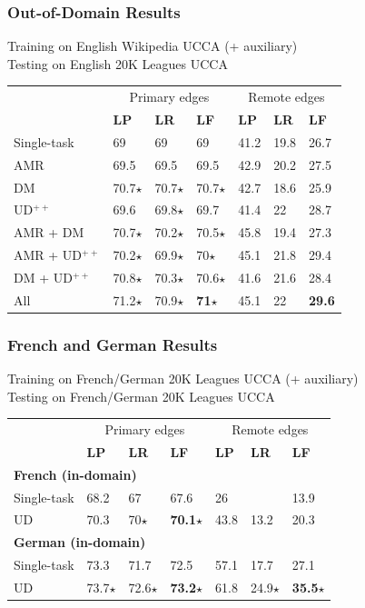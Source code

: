 \documentclass[t,xcolor={svgnames}]{beamer}
\begin{document}
\begin{frame}
\frametitle{Out-of-Domain Results}
Training on English Wikipedia UCCA (+ auxiliary) \\ Testing on English 20K Leagues UCCA
\begin{center}
	\begin{tabular}{l|lll|lll}
	& \multicolumn{3}{c|}{Primary edges} & \multicolumn{3}{c}{Remote edges} \\
	& \textbf{LP} & \textbf{LR} & \textbf{LF}
	& \textbf{LP} & \textbf{LR} & \textbf{LF} \\
	\hline
	Single-task
	& 69 & 69 & 69 & 41.2 & 19.8 & 26.7 \\
	\cline{1-1}
	AMR
	& 69.5 & 69.5 & 69.5 & 42.9 & 20.2 & 27.5 \\
	DM
	& 70.7$\star$ & 70.7$\star$ & 70.7$\star$ & 42.7 & 18.6 & 25.9 \\
	UD$^{++}$
	& 69.6 & 69.8$\star$ & 69.7 & 41.4 & 22 & 28.7 \\
	AMR + DM
	& 70.7$\star$ & 70.2$\star$ & 70.5$\star$ & 45.8 & 19.4 & 27.3 \\
	AMR + UD$^{++}$
	& 70.2$\star$ & 69.9$\star$ & 70$\star$ & 45.1 & 21.8 & 29.4 \\
	DM + UD$^{++}$
	& 70.8$\star$ & 70.3$\star$ & 70.6$\star$ & 41.6 & 21.6 & 28.4 \\
	All
	& 71.2$\star$ & 70.9$\star$ & \textbf{71}$\star$ & 45.1 & 22 & \textbf{29.6}
	\end{tabular}
\end{center}
\end{frame}

\begin{frame}
\frametitle{French and German Results}
Training on French/German 20K Leagues UCCA (+ auxiliary) \\ Testing on French/German 20K Leagues UCCA
\begin{center}
	\begin{tabular}{l|lll|lll}
	& \multicolumn{3}{c|}{Primary edges} & \multicolumn{3}{c}{Remote edges} \\
	& \textbf{LP} & \textbf{LR} & \textbf{LF}
	& \textbf{LP} & \textbf{LR} & \textbf{LF} \\
	\hline
	\multicolumn{4}{l|}{\bf French (in-domain)} & \\
	Single-task & 68.2 & 67 & 67.6 & 26 & \enskip 9.4 & 13.9 \\
	UD & 70.3 & 70$\star$ & \textbf{70.1}$\star$ & 43.8 & 13.2 & 20.3 \\
	\hline
	\multicolumn{4}{l|}{\bf German (in-domain)} & \\
	Single-task & 73.3 & 71.7 & 72.5 & 57.1 & 17.7 & 27.1 \\
	UD & 73.7$\star$ & 72.6$\star$ & \textbf{73.2}$\star$ & 61.8 & 24.9$\star$ & \textbf{35.5}$\star$
	\end{tabular}
\end{center}
\end{frame}
\end{document}
